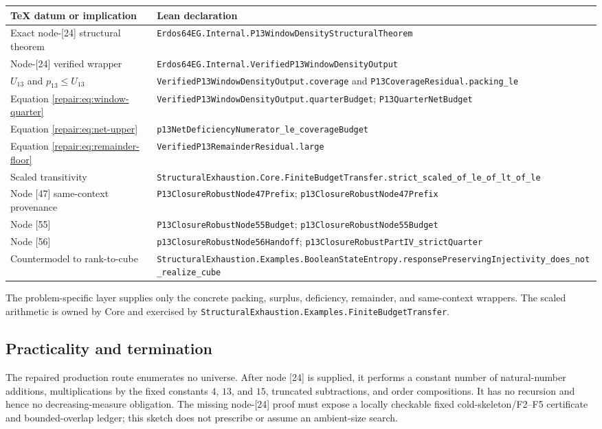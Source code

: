 \begin{center}
\begin{tabular}{p{}p{}}
TeX datum or implication & Lean declaration \\
\midrule
Exact node-[24] structural theorem & \texttt{Erdos64EG.Internal.P13WindowDensityStructuralTheorem} \\
Node-[24] verified wrapper & \texttt{Erdos64EG.Internal.VerifiedP13WindowDensityOutput} \\
$U_{13}$ and $p_{13}\le U_{13}$ & \texttt{VerifiedP13WindowDensityOutput.coverage} and \texttt{P13CoverageResidual.packing\_le} \\
Equation \eqref{repair:eq:window-quarter} & \texttt{VerifiedP13WindowDensityOutput.quarterBudget}; \texttt{P13QuarterNetBudget} \\
Equation \eqref{repair:eq:net-upper} & \texttt{p13NetDeficiencyNumerator\_le\_coverageBudget} \\
Equation \eqref{repair:eq:remainder-floor} & \texttt{VerifiedP13RemainderResidual.large} \\
Scaled transitivity & \texttt{StructuralExhaustion.Core.FiniteBudgetTransfer.strict\_scaled\_of\_le\_of\_lt\_of\_le} \\
Node [47] same-context provenance & \texttt{P13ClosureRobustNode47Prefix}; \texttt{p13ClosureRobustNode47Prefix} \\
Node [55] & \texttt{P13ClosureRobustNode55Budget}; \texttt{p13ClosureRobustNode55Budget} \\
Node [56] & \texttt{p13ClosureRobustNode56Handoff}; \texttt{p13ClosureRobustPartIV\_strictQuarter} \\
Countermodel to rank-to-cube & \texttt{StructuralExhaustion.Examples.BooleanStateEntropy.responsePreservingInjectivity\_does\_not\_realize\_cube} \\
\end{tabular}
\end{center}

The problem-specific layer supplies only the concrete packing, surplus,
deficiency, remainder, and same-context wrappers.  The scaled arithmetic is
owned by Core and exercised by
\texttt{StructuralExhaustion.Examples.FiniteBudgetTransfer}.

\subsection*{Practicality and termination}

The repaired production route enumerates no universe.  After node [24] is
supplied, it performs a constant number of natural-number additions,
multiplications by the fixed constants $4$, $13$, and $15$, truncated
subtractions, and order compositions.  It has no recursion and hence no
decreasing-measure obligation.  The missing node-[24] proof must expose a
locally checkable fixed cold-skeleton/F2--F5 certificate and bounded-overlap
ledger; this sketch does not prescribe or assume an ambient-size search.
